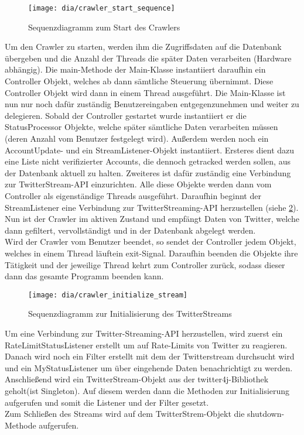 \begin{figure}[h!]
	\centering
	\texttt{[image: dia/crawler\_start\_sequence]}
	\caption{Sequenzdiagramm zum Start des Crawlers}
	\label{fig:crawler_start}
\end{figure}

Um den Crawler zu starten, werden ihm die Zugriffsdaten auf die Datenbank übergeben und die Anzahl der Threads die später Daten verarbeiten (Hardware abhängig).
Die main-Methode der Main-Klasse instantiiert daraufhin ein Controller Objekt, welches ab dann sämtliche Steuerung übernimmt. Diese Controller Objekt wird dann in einem Thread ausgeführt. Die Main-Klasse ist nun nur noch dafür zuständig Benutzereingaben entgegenzunehmen und weiter zu delegieren.
Sobald der Controller gestartet wurde instantiiert er die StatusProcessor Objekte, welche später sämtliche Daten verarbeiten müssen (deren Anzahl vom Benutzer festgelegt wird). Außerdem werden noch ein AccountUpdate- und ein StreamListener-Objekt instantiiert. Ersteres dient dazu eine Liste nicht verifizierter Accounts, die dennoch getracked werden sollen, aus der Datenbank aktuell zu halten. Zweiteres ist dafür zuständig eine Verbindung zur TwitterStream-API einzurichten. Alle diese Objekte werden dann vom Controller als eigenständige Threads ausgeführt.
Daraufhin beginnt der StreamListener eine Verbindung zur TwitterStreaming-API herzustellen (siehe \cref{fig:initialize_stream}).\\
Nun ist der Crawler im aktiven Zustand und empfängt Daten von Twitter, welche dann gefiltert, vervollständigt und in der Datenbank abgelegt werden.\\
Wird der Crawler vom Benutzer beendet, so sendet der Controller jedem Objekt, welches in einem Thread läuftein exit-Signal. Daraufhin beenden die Objekte ihre Tätigkeit und der jeweilige Thread kehrt zum Controller zurück, sodass dieser dann das gesamte Programm beenden kann.
\\

\begin{figure}[h!]
	\centering
	\texttt{[image: dia/crawler\_initialize\_stream]}
	\caption{Sequenzdiagramm zur Initialisierung des TwitterStreams}
	\label{fig:initialize_stream}
\end{figure}

Um eine Verbindung zur Twitter-Streaming-API herzustellen, wird zuerst ein RateLimitStatusListener erstellt um auf Rate-Limits von Twitter zu reagieren. Danach wird noch ein Filter erstellt mit dem der Twitterstream durchsucht wird und ein MyStatusListener um über eingehende Daten benachrichtigt zu werden.
Anschließend wird ein TwitterStream-Objekt aus der twitter4j-Bibliothek geholt(ist Singleton). Auf diesem werden dann die Methoden zur Initialisierung aufgerufen und somit die Listener und der Filter gesetzt.\\
Zum Schließen des Streams wird auf dem TwitterStrem-Objekt die shutdown-Methode aufgerufen.

